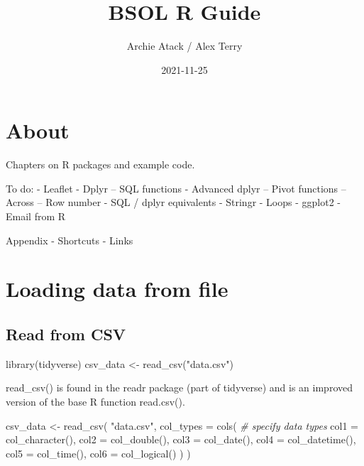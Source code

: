 \documentclass[
]{book}
\title{BSOL R Guide}
\author{Archie Atack / Alex Terry}
\date{2021-11-25}
\newenvironment{Shaded}{\begin{snugshade}}{\end{snugshade}}
\newcommand{\AttributeTok}[1]{\textcolor[rgb]{0.77,0.63,0.00}{#1}}
\newcommand{\CommentTok}[1]{\textcolor[rgb]{0.56,0.35,0.01}{\textit{#1}}}
\newcommand{\FunctionTok}[1]{\textcolor[rgb]{0.00,0.00,0.00}{#1}}
\newcommand{\NormalTok}[1]{#1}
\newcommand{\OtherTok}[1]{\textcolor[rgb]{0.56,0.35,0.01}{#1}}
\newcommand{\StringTok}[1]{\textcolor[rgb]{0.31,0.60,0.02}{#1}}
\begin{document}
\maketitle

{
\setcounter{tocdepth}{1}
\tableofcontents
}
\hypertarget{about}{%
\chapter{About}\label{about}}

Chapters on R packages and example code.

To do:
- Leaflet
- Dplyr
-- SQL functions
- Advanced dplyr
-- Pivot functions
-- Across
-- Row number
- SQL / dplyr equivalents
- Stringr
- Loops
- ggplot2
- Email from R

Appendix
- Shortcuts
- Links

\hypertarget{loading-data-from-file}{%
\chapter{Loading data from file}\label{loading-data-from-file}}

\hypertarget{read-from-csv}{%
\section{Read from CSV}\label{read-from-csv}}

\begin{Shaded}
\begin{Highlighting}[]
\FunctionTok{library}\NormalTok{(tidyverse)}
\NormalTok{csv\_data }\OtherTok{\textless{}{-}} \FunctionTok{read\_csv}\NormalTok{(}\StringTok{"data.csv"}\NormalTok{)}
\end{Highlighting}
\end{Shaded}

read\_csv() is found in the readr package (part of tidyverse) and is an improved version of the base R function read.csv().

\begin{Shaded}
\begin{Highlighting}[]
\NormalTok{csv\_data }\OtherTok{\textless{}{-}} \FunctionTok{read\_csv}\NormalTok{(}
  \StringTok{"data.csv"}\NormalTok{,}
  \AttributeTok{col\_types =} \FunctionTok{cols}\NormalTok{( }\CommentTok{\# specify data types}
    \AttributeTok{col1 =} \FunctionTok{col\_character}\NormalTok{(),}
    \AttributeTok{col2 =} \FunctionTok{col\_double}\NormalTok{(),}
    \AttributeTok{col3 =} \FunctionTok{col\_date}\NormalTok{(),}
    \AttributeTok{col4 =} \FunctionTok{col\_datetime}\NormalTok{(),}
    \AttributeTok{col5 =} \FunctionTok{col\_time}\NormalTok{(),}
    \AttributeTok{col6 =} \FunctionTok{col\_logical}\NormalTok{()}
\NormalTok{  )}
\NormalTok{)}
\end{Highlighting}
\end{Shaded}
\end{document}
